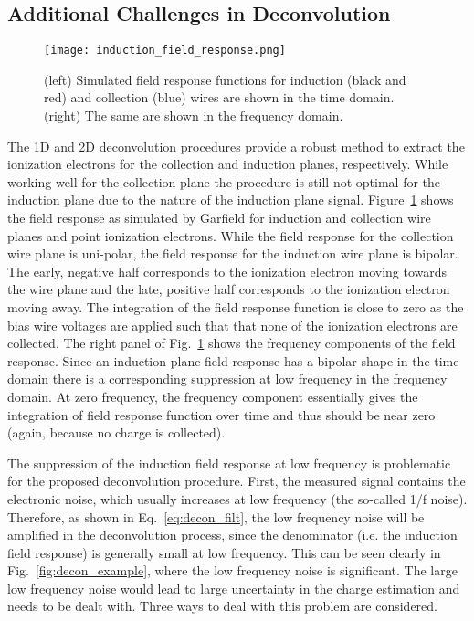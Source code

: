 \subsection{Additional Challenges in Deconvolution}

\begin{figure}[htb]
\centering
\texttt{[image: induction\_field\_response.png]}
\caption{(left) Simulated field response functions for induction (black and red) and 
collection (blue) wires are shown in the time domain. (right) The same are shown in 
the frequency domain.}
\label{fig:induction_field}
\end{figure}

The 1D and 2D deconvolution procedures provide a robust method to extract the ionization
electrons for the collection and induction planes, respectively. 
%
While working well for the collection plane the procedure is still not optimal for the induction plane due to the 
nature of the induction plane signal. Figure~\ref{fig:induction_field} shows the 
field response as simulated by Garfield for induction and collection wire planes and point ionization
electrons. While the field response for the collection wire plane is uni-polar, the field 
response for the induction wire plane is bipolar. 
%
The early, negative half corresponds to the ionization electron moving
towards the wire plane and the late, positive half corresponds
to the ionization electron moving away.
%
The integration of the field response function is close to zero
as the bias wire voltages are applied such that that none of the ionization electrons are
collected. The right panel of Fig.~\ref{fig:induction_field} shows the 
frequency components of the field response. 
%
Since an induction plane field response has a
bipolar shape in the time domain there is a corresponding suppression at low frequency in the frequency 
domain. At zero frequency, the frequency component essentially gives the 
integration of field response function over time and thus should be near zero (again, because no charge is collected).


The suppression of the induction field response at low frequency is problematic for the
proposed deconvolution procedure. First,  the measured signal contains the electronic noise, 
which usually increases at low frequency (the so-called 1/f noise). Therefore, as shown in 
Eq.~\eqref{eq:decon_filt}, the low frequency noise will be amplified in the deconvolution 
process, since the denominator (i.e. the induction field response) is generally small at 
low frequency. This can be seen clearly in Fig.~\ref{fig:decon_example}, where the low frequency noise
is significant. The large low frequency noise would lead to large uncertainty 
in the charge estimation and needs to be dealt with. Three ways to deal with this problem 
are considered. 

